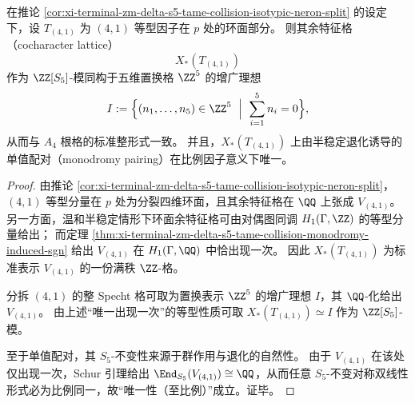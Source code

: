 \begin{theorem}\label{thm:xi-terminal-zm-delta-s5-tame-collision-a4-rootlattice-monodromy-pairing}
在推论 \ref{cor:xi-terminal-zm-delta-s5-tame-collision-isotypic-neron-split} 的设定下，设 \(T_{(4,1)}\) 为 \((4,1)\) 等型因子在 \(p\) 处的环面部分。
则其余特征格（cocharacter lattice）
\[
X_*(T_{(4,1)})
\]
作为 \(\ZZ[S_5]\)-模同构于五维置换格 \(\ZZ^5\) 的增广理想
\[
I:=\Bigl\{(n_1,\dots,n_5)\in\ZZ^5\ \Bigm|\ \sum_{i=1}^5 n_i=0\Bigr\},
\]
从而与 \(A_4\) 根格的标准整形式一致。
并且，\(X_*(T_{(4,1)})\) 上由半稳定退化诱导的单值配对（monodromy pairing）在比例因子意义下唯一。
\end{theorem}
\begin{proof}
由推论 \ref{cor:xi-terminal-zm-delta-s5-tame-collision-isotypic-neron-split}，\((4,1)\) 等型分量在 \(p\) 处为分裂四维环面，且其余特征格在 \(\QQ\) 上张成 \(V_{(4,1)}\)。
另一方面，温和半稳定情形下环面余特征格可由对偶图同调 \(H_1(\Gamma,\ZZ)\) 的等型分量给出；
而定理 \ref{thm:xi-terminal-zm-delta-s5-tame-collision-monodromy-induced-sgn} 给出 \(V_{(4,1)}\) 在 \(H_1(\Gamma,\QQ)\) 中恰出现一次。
因此 \(X_*(T_{(4,1)})\) 为标准表示 \(V_{(4,1)}\) 的一份满秩 \(\ZZ\)-格。
\par
分拆 \((4,1)\) 的整 Specht 格可取为置换表示 \(\ZZ^5\) 的增广理想 \(I\)，其 \(\QQ\)-化给出 \(V_{(4,1)}\)。
由上述“唯一出现一次”的等型性质可取 \(X_*(T_{(4,1)})\simeq I\) 作为 \(\ZZ[S_5]\)-模。
\par
至于单值配对，其 \(S_5\)-不变性来源于群作用与退化的自然性。
由于 \(V_{(4,1)}\) 在该处仅出现一次，Schur 引理给出 \(\End_{S_5}(V_{(4,1)})\cong\QQ\)，从而任意 \(S_5\)-不变对称双线性形式必为比例同一，故“唯一性（至比例）”成立。证毕。
\end{proof}

